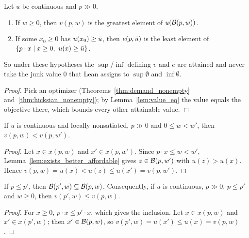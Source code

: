 \begin{proposition}
\label{thm:value_attained}
\leanok
{}
Let $u$ be continuous and $p \gg 0$.
\begin{enumerate}
  \item If $w \ge 0$, then $v(p, w)$ is the greatest element of $u(\mathcal{B}(p, w))$.
  \item If some $x_0 \ge 0$ has $u(x_0) \ge \bar{u}$, then $e(p, \bar{u})$ is the least
        element of $\{p \cdot x \mid x \ge 0,\ u(x) \ge \bar{u}\}$.
\end{enumerate}
So under these hypotheses the $\sup$/$\inf$ defining $v$ and $e$ are attained and
never take the junk value $0$ that Lean assigns to $\sup \emptyset$ and $\inf \emptyset$.
\end{proposition}
\begin{proof}
\leanok
Pick an optimizer (Theorems~\ref{thm:demand_nonempty} and~\ref{thm:hicksian_nonempty});
by Lemma~\ref{lem:value_eq} the value equals the objective there, which bounds every other
attainable value.
\end{proof}

\begin{proposition}
\label{thm:indirectUtility_strictMono}
\leanok
{}
If $u$ is continuous and locally nonsatiated, $p \gg 0$ and $0 \le w < w'$, then
$v(p, w) < v(p, w')$.
\end{proposition}
\begin{proof}
\leanok
Let $x \in x(p, w)$ and $x' \in x(p, w')$. Since $p \cdot x \le w < w'$,
Lemma~\ref{lem:exists_better_affordable} gives $z \in \mathcal{B}(p, w')$ with $u(z) > u(x)$.
Hence $v(p, w) = u(x) < u(z) \le u(x') = v(p, w')$.
\end{proof}

\begin{proposition}
\label{thm:indirectUtility_antitone_price}
\leanok
{}
If $p \le p'$, then $\mathcal{B}(p', w) \subseteq \mathcal{B}(p, w)$. Consequently, if $u$ is continuous,
$p \gg 0$, $p \le p'$ and $w \ge 0$, then $v(p', w) \le v(p, w)$.
\end{proposition}
\begin{proof}
\leanok
For $x \ge 0$, $p \cdot x \le p' \cdot x$, which gives the inclusion. Let $x \in x(p, w)$ and
$x' \in x(p', w)$; then $x' \in \mathcal{B}(p, w)$, so $v(p', w) = u(x') \le u(x) = v(p, w)$.
\end{proof}


